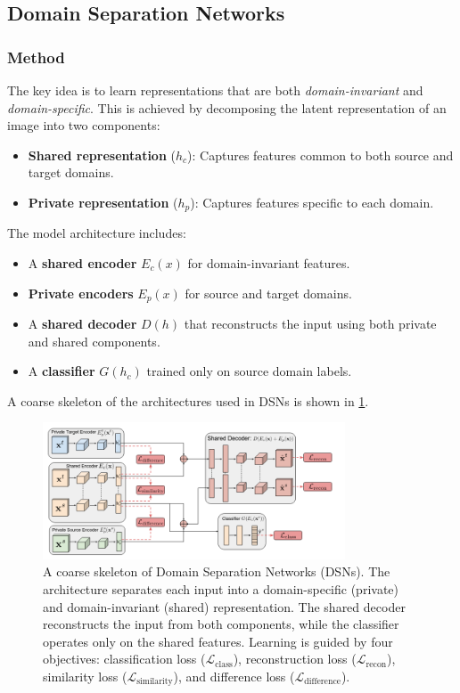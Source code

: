\documentclass{article}
\begin{document}
\subsection{Domain Separation Networks}
\subsubsection{Method}

The key idea is to learn representations that are both \textit{domain-invariant} and \textit{domain-specific}. This is achieved by decomposing the latent representation of an image into two components:
\begin{itemize}
    \item \textbf{Shared representation} (\( h_c \)): Captures features common to both source and target domains.
    \item \textbf{Private representation} (\( h_p \)): Captures features specific to each domain.
\end{itemize}

The model architecture includes:
\begin{itemize}
    \item A \textbf{shared encoder} \( E_c(x) \) for domain-invariant features.
    \item \textbf{Private encoders} \( E_p(x) \) for source and target domains.
    \item A \textbf{shared decoder} \( D(h) \) that reconstructs the input using both private and shared components.
    \item A \textbf{classifier} \( G(h_c) \) trained only on source domain labels.
\end{itemize}

A coarse skeleton of the architectures used in DSNs is shown in \ref{fig:dsn_arch}.

\begin{figure}[h]
  \centering
  \includegraphics[width=0.8\textwidth]{images/DSN/DSN_arch.png}
  \caption{A coarse skeleton of Domain Separation Networks (DSNs). The architecture separates each input into a domain-specific (private) and domain-invariant (shared) representation. The shared decoder reconstructs the input from both components, while the classifier operates only on the shared features. Learning is guided by four objectives: classification loss (\(\mathcal{L}_{\text{class}}\)), reconstruction loss (\(\mathcal{L}_{\text{recon}}\)), similarity loss (\(\mathcal{L}_{\text{similarity}}\)), and difference loss (\(\mathcal{L}_{\text{difference}}\)).}
  \label{fig:dsn_arch}
\end{figure}
\end{document}
